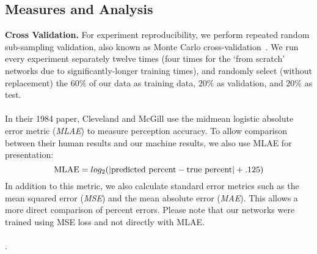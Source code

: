 \subsection{Measures and Analysis}
\label{sec:measuresandanalysis}

\noindent\textbf{Cross Validation.} For experiment reproducibility, we perform repeated random sub-sampling validation, also known as Monte Carlo cross-validation~\cite{xu2001monte}. We run every experiment separately twelve times (four times for the `from scratch' networks due to significantly-longer training times), and randomly select (without replacement) the $60\%$ of our data as training data, $20\%$ as validation, and $20\%$ as test. 
\\~\\
 In their 1984 paper, Cleveland and McGill use the midmean logistic absolute error metric (\emph{MLAE}) to measure perception accuracy. To allow comparison between their human results and our machine results, we also use MLAE for presentation:
\begin{equation}
	\textnormal{MLAE} = log_2( | \textnormal{predicted percent} - \textnormal{true percent} | + .125)
\end{equation}
In addition to this metric, we also calculate standard error metrics such as the mean squared error (\emph{MSE}) and the mean absolute error (\emph{MAE}). This allows a more direct comparison of percent errors. Please note that our networks were trained using MSE loss and not directly with MLAE.
\\~\\
 . %
